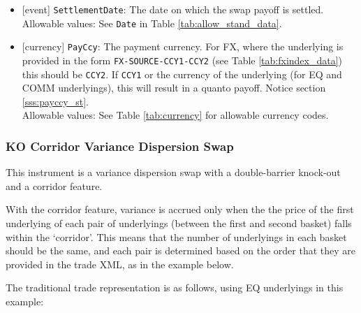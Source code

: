 \begin{itemize}
  \item{}[event] \lstinline!SettlementDate!: The date on which the swap payoff is settled. \\
  Allowable values: See \lstinline!Date! in Table \ref{tab:allow_stand_data}.
  \item{}[currency] \lstinline!PayCcy!: The payment currency. For FX, where the underlying is provided
      in the form \lstinline!FX-SOURCE-CCY1-CCY2! (see Table \ref{tab:fxindex_data}) this should
      be \lstinline!CCY2!. If \lstinline!CCY1! or the currency of the underlying (for EQ and
      COMM underlyings), this will result in a quanto payoff. Notice section \ref{sss:payccy_st}. \\
        Allowable values: See Table \ref{tab:currency} for allowable currency codes.
\end{itemize}

\subsubsection*{KO Corridor Variance Dispersion Swap}

This instrument is a variance dispersion swap with a double-barrier knock-out and a corridor feature.

With the corridor feature, variance is accrued only when the the price of the first underlying of each pair of
underlyings (between the first and second basket) falls within the `corridor'. This means that the number of
underlyings in each basket should be the same, and each pair is determined based on the order that they are
provided in the trade XML, as in the example below.

The traditional trade representation is as follows, using EQ underlyings in this example:

